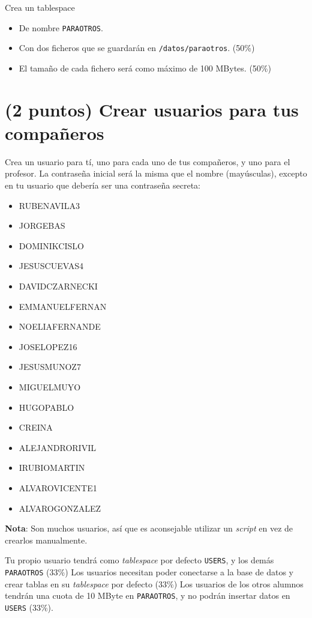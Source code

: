 \documentclass[a4paper]{article}
\begin{document}
Crea un tablespace
\begin{itemize}
\item De nombre \texttt{PARAOTROS}.
\item Con dos ficheros que se guardarán en \texttt{/datos/paraotros}. (50\%)
\item El tamaño de cada fichero será como máximo de 100 MBytes. (50\%)
\end{itemize}

\section{(2 puntos) Crear usuarios para tus compañeros}
\label{sec:org0000006}

Crea un usuario para tí, uno para cada uno de tus compañeros, y uno para el profesor. La contraseña inicial será la misma que el nombre (mayúsculas), excepto en tu usuario que debería ser una contraseña secreta:
\begin{multicols}{3}
\begin{itemize}
\item RUBENAVILA3
\item JORGEBAS
\item DOMINIKCISLO
\item JESUSCUEVAS4
\item DAVIDCZARNECKI
\item EMMANUELFERNAN
\item NOELIAFERNANDE
\item JOSELOPEZ16
\item JESUSMUNOZ7
\item MIGUELMUYO
\item HUGOPABLO
\item CREINA
\item ALEJANDRORIVIL
\item IRUBIOMARTIN
\item ALVAROVICENTE1
\item ALVAROGONZALEZ
\end{itemize}
\end{multicols}
\textbf{Nota}: Son muchos usuarios, así que es aconsejable utilizar un \emph{script} en vez de crearlos manualmente.

Tu propio usuario tendrá como \emph{tablespace} por defecto \texttt{USERS}, y los demás \texttt{PARAOTROS} (33\%)
Los usuarios necesitan poder conectarse a la base de datos y crear tablas en su \emph{tablespace} por defecto (33\%)
Los usuarios de los otros alumnos tendrán una cuota de 10 MByte en \texttt{PARAOTROS}, y no podrán insertar datos en \texttt{USERS} (33\%).
\end{document}
